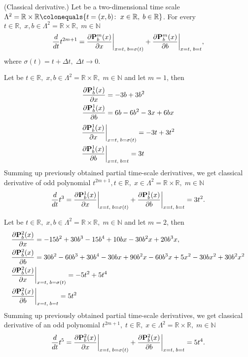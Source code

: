 \begin{cor}
    \label{derivative_case}
    (Classical derivative.)
    Let be a two-dimensional time scale
    $\Lambda^2 = \mathbb{R} \times \mathbb{R} \colonequals \{t=(x, b) \colon \; x\in \mathbb{R}, \; b\in\mathbb{R} \}$.
    For every $t\in\mathbb{R}, \; x,b\in \Lambda^2 = \mathbb{R} \times \mathbb{R}, \; m\in\mathbb{N}$
    \[
        \derivative{t^{2m+1}}{t}
        = \pderivative{\polynomialP{m}{b}{x}}{x} \bigg |_{x = t, \; b = \sigma(t)}
        + \pderivative{\polynomialP{m}{b}{x}}{b} \bigg |_{x = t, \; b = t},
    \]
    where $\sigma(t) = t + \Delta t, \; \Delta t \to 0.$
\end{cor}
\begin{examp}
    \label{time_scale_r_example_1}
    Let be $t\in\mathbb{R}, \; x,b\in \Lambda^2 = \mathbb{R} \times \mathbb{R}, \; m\in\mathbb{N}$ and let $m=1$, then
    \begin{align*}
        \pderivative{\polynomialP{1}{b}{x}}{x} &= -3 b + 3 b^2 \\
        \pderivative{\polynomialP{1}{b}{x}}{b} &= 6 b - 6 b^2 - 3 x + 6 b x
    \end{align*}
    \begin{align*}
        &\pderivative{\polynomialP{1}{b}{x}}{x} \bigg |_{x = t, \; b = \sigma(t)} = -3t + 3t^2 \\
        &\pderivative{\polynomialP{1}{b}{x}}{b} \bigg |_{x = t, \; b = t} = 3t
    \end{align*}
    Summing up previously obtained partial time-scale derivatives, we get classical derivative of odd polynomial
    $t^{2m+1}, t\in\mathbb{R}, \; x\in \Lambda^2 = \mathbb{R} \times \mathbb{R}, \; m\in\mathbb{N}$
    \[
        \derivative{t^3}{t}
        = \pderivative{\polynomialP{1}{b}{x}}{x} \bigg |_{x = t, \; b = \sigma(t)}
        + \pderivative{\polynomialP{1}{b}{x}}{b} \bigg |_{x = t, \; b = t}
        = 3t^2.
    \]
\end{examp}
\begin{examp}
    \label{time_scale_r_example_2}
    Let be $t\in\mathbb{R}, \; x,b\in \Lambda^2 = \mathbb{R} \times \mathbb{R}, \; m\in\mathbb{N}$ and let $m=2$, then
    \begin{align*}
        &\pderivative{\polynomialP{2}{b}{x}}{x} = -15 b^2 + 30 b^3 - 15 b^4 + 10 b x - 30 b^2 x + 20 b^3 x, \\
        &\pderivative{\polynomialP{2}{b}{x}}{b} = 30 b^2 - 60 b^3 + 30 b^4 - 30 b x + 90 b^2 x - 60 b^3 x + 5 x^2 - 30 b x^2
        + 30 b^2 x^2 \\
        &\pderivative{\polynomialP{2}{b}{x}}{x} \bigg |_{x = t, \; b = \sigma(t)} = -5 t^2 + 5 t^4 \\
        &\pderivative{\polynomialP{2}{b}{x}}{b} \bigg |_{x = t, \; b = t} = 5 t^2
    \end{align*}
    Summing up previously obtained partial time-scale derivatives, we get classical derivative of an odd polynomial
    $t^{2m+1}, \; t\in\mathbb{R}, \; x\in \Lambda^2 = \mathbb{R} \times \mathbb{R}, \; m\in\mathbb{N}$
    \[
        \derivative{t^5}{t}
        = \pderivative{\polynomialP{2}{b}{x}}{x} \bigg |_{x = t, \; b = \sigma(t)}
        + \pderivative{\polynomialP{2}{b}{x}}{b} \bigg |_{x = t, \; b = t}
        = 5t^4.
    \]
\end{examp}